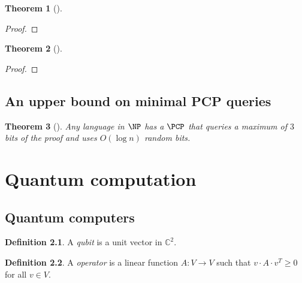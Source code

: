 \documentclass[english,12pt]{reedthesis}
\theoremstyle{plain}
\newtheorem{thm}{Theorem}[section]
\theoremstyle{definition}
\newtheorem{defn}[defn]{Definition}
\theoremstyle{remark}
\begin{document}

\begin{thm}[{\cite[Theorem 2.1.9]{ALMSS98}}]
\end{thm}

\begin{proof}
\end{proof}

\begin{thm}[{\cite[Prop.\ 2.14]{BGHSV06}}]
\end{thm}

\begin{proof}
\end{proof}

\section{An upper bound on minimal PCP queries}\label{sec:pcp-query-complexity}

\begin{thm}[{\cite{Has97}}]\label{thm:pcp-max-queries}
  Any language in $\NP$ has a $\PCP$ that queries a maximum of $3$ bits of the
  proof and uses $O(\log n)$ random bits.
\end{thm}

\chapter{Quantum computation}\label{chap:quantum}

\section{Quantum computers}\label{sec:quant-comp}

\begin{defn}\label{def:qubit}
  A \emph{qubit} is a unit vector in $\mathbb{C}^{2}$.
\end{defn}

\begin{defn}\label{def:operator}
  A \emph{operator} is a linear function $A: V \rightarrow V$ such that
  $v \cdot A \cdot v^{T} \ge 0$ for all $v \in V$.
\end{defn}
\end{document}
